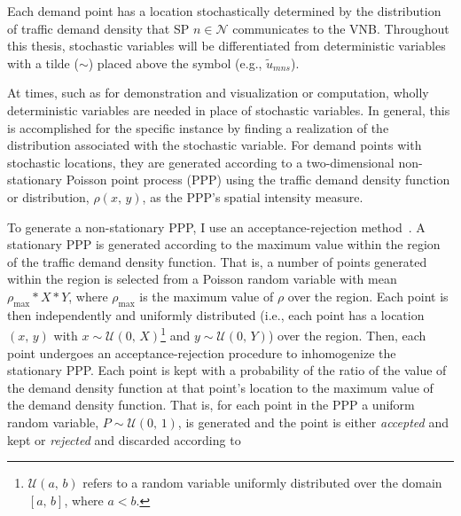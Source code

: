 \documentclass[12pt,dvipsnames]{report}
\begin{document}
Each demand point has a location stochastically determined by the distribution of traffic demand density that SP $n \in \mathcal{N}$ communicates to the VNB.  Throughout this thesis, stochastic variables will be differentiated from deterministic variables with a tilde ($\sim$) placed above the symbol (e.g., $\tilde{u}_{mns}$).

At times, such as for demonstration and visualization or computation, wholly deterministic variables are needed in place of stochastic variables.  In general, this is accomplished for the specific instance by finding a realization of the distribution associated with the stochastic variable.  For demand points with stochastic locations, they are generated according to a two-dimensional non-stationary Poisson point process (PPP) using the traffic demand density function or distribution, $\rho\left(x,\, y\right)$, as the PPP's spatial intensity measure.

To generate a non-stationary PPP, I use an acceptance-rejection method~\cite{leeds:nsPPPgeneration}.  A stationary PPP is generated according to the maximum value within the region of the traffic demand density function.  That is, a number of points generated within the region is selected from a Poisson random variable with mean $\rho_{\max}*X*Y$, where $\rho_{\max}$ is the maximum value of $\rho$ over the region.  Each point is then independently and uniformly distributed (i.e., each point has a location $\left(x,\, y\right)$ with $x \sim \mathcal{U}\left(0,\, X\right)$\footnote{$\mathcal{U}\left(a,\, b\right)$ refers to a random variable uniformly distributed over the domain $\left[a,\, b\right]$, where $a < b$.} and $y \sim \mathcal{U}\left(0,\, Y\right)$) over the region.  Then, each point undergoes an acceptance-rejection procedure to inhomogenize the stationary PPP.  Each point is kept with a probability of the ratio of the value of the demand density function at that point's location to the maximum value of the demand density function.  That is, for each point in the PPP a uniform random variable, $P \sim \mathcal{U}\left(0,\, 1\right)$, is generated and the point is either \emph{accepted} and kept or \emph{rejected} and discarded according to
\end{document}
